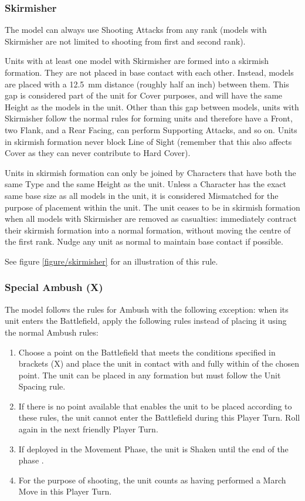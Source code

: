 \subsubsection{Skirmisher}
\idx[main=y]{\skirmisher}\label{skirmisher}

The model can always use Shooting Attacks from any rank (models with Skirmisher are not limited to shooting from first and second rank).

Units with at least one \rnf{} model with Skirmisher are formed into a skirmish formation. They are not placed in base contact with each other. Instead, models are placed with a \SI{12.5}{\milli\meter} distance (roughly half an inch) between them. This gap is considered part of the unit for Cover purposes, and will have the same Height as the models in the unit. Other than this gap between models, units with Skirmisher follow the normal rules for forming units and therefore have a Front, two Flank, and a Rear Facing, can perform Supporting Attacks, and so on. Units in skirmish formation never block Line of Sight (remember that this also affects Cover as they can never contribute to Hard Cover).

Units in skirmish formation can only be joined by Characters that have both the same Type and the same Height as the unit. Unless a Character has the exact same base size as all \rnf{} models in the unit, it is considered Mismatched for the purpose of placement within the unit. The unit ceases to be in skirmish formation when all \rnf{} models with Skirmisher are removed as casualties: immediately contract their skirmish formation into a normal formation, without moving the centre of the first rank. Nudge any unit as normal to maintain base contact if possible.

See figure \ref{figure/skirmisher} for an illustration of this rule.

\subsubsection{Special Ambush (X)}
\idx[main=y]{\specialambush}\label{special_ambush}

The model follows the rules for Ambush with the following exception: when its unit enters the Battlefield, apply the following rules instead of placing it using the normal Ambush rules:
\begin{enumerate}
	\item Choose a point on the Battlefield that meets the conditions specified in brackets (X) and place the unit in contact with and fully within  of the chosen point. The unit can be placed in any formation but must follow the Unit Spacing rule.
	\item If there is no point available that enables the unit  to be placed according to these rules,  the unit cannot enter the Battlefield during this Player Turn. Roll again in the next friendly Player Turn.
	\item If deployed in the Movement Phase, the unit is Shaken until the end of the phase .
	\item For the purpose of shooting, the unit counts as having performed a March Move in this Player Turn.
\end{enumerate}

